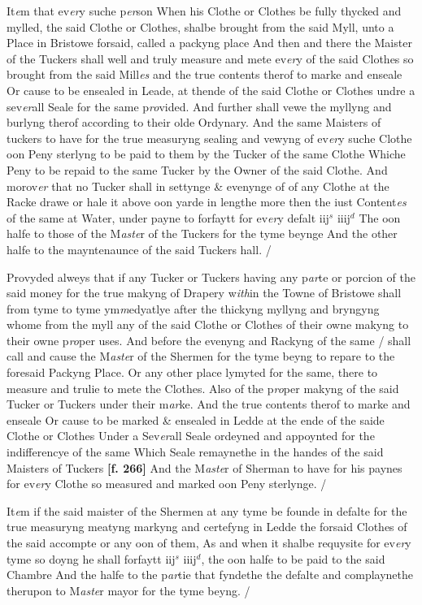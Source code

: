 \documentclass[a4paper,12pt]{article}
\begin{document}
It\textit{e}m that ev\textit{er}y suche p\textit{er}son When his Clothe or Clothes be fully thycked and mylled, the said Clothe or Clothes, shalbe brought from the said Myll, unto a Place in Bristowe forsaid, called a packyng place And then and there the Maister of the Tuckers shall well and truly measure and mete ev\textit{er}y of the said Clothes so brought from the said Mill\textit{es} and the true contents therof to marke and enseale Or cause to be ensealed in Leade, at thende of the said Clothe or Clothes undre a sev\textit{er}all Seale for the same p\textit{ro}vided. And further shall vewe the myllyng and burlyng therof according to their olde Ordynary. And the same Maisters of tuckers to have for the true measuryng sealing and vewyng of ev\textit{er}y suche Clothe oon Peny sterlyng to be paid to them by the Tucker of the same Clothe Whiche Peny to be repaid to the same Tucker by the Owner of the said Clothe. And morov\textit{er} that no Tucker shall in settynge \& evenynge of of any Clothe at the Racke drawe or hale it above oon yarde in lengthe more then the iust Content\textit{es} of the same at Water, under payne to forfaytt for ev\textit{er}y defalt iij$^{s}$ iiij$^{d}$  The oon halfe to those of the M\textit{aste}r of the Tuckers for the tyme beynge  And the other halfe to the mayntenaunce of the said Tuckers hall. /

Provyded alweys that if any Tucker or Tuckers having any p\textit{ar}te or porcion of the said money for the true makyng of Drapery w\textit{ith}in the Towne of Bristowe shall from tyme to tyme ym\textit{m}edyatlye after the thickyng myllyng and bryngyng whome from the myll any of the said Clothe or Clothes of their owne makyng to their owne p\textit{ro}per uses. And before the evenyng and Rackyng of the same / shall call and cause the M\textit{aste}r of the Shermen for the tyme beyng to repare to the foresaid Packyng Place. Or any other place lymyted for the same, there to measure and trulie to mete the Clothes. Also of the p\textit{ro}per makyng of the said Tucker or Tuckers under their m\textit{ar}ke. And the true contents therof to marke and enseale Or cause to be marked \& ensealed in Ledde at the ende of the saide Clothe or Clothes Under a Sev\textit{er}all Seale ordeyned and appoynted for the indifferencye of the same Which Seale remaynethe in the handes of the said Maisters of Tuckers \textbf{[f. 266]} And the M\textit{aste}r of Sherman to have for his paynes for ev\textit{er}y Clothe so measured and marked oon Peny sterlynge. /

It\textit{e}m if the said maister of the Shermen at any tyme be founde in defalte for the true measuryng meatyng markyng and certefyng in Ledde the forsaid Clothes of the said accompte or any oon of them, As and when it shalbe requysite for ev\textit{er}y tyme so doyng he shall forfaytt iij$^{s}$ iiij$^{d}$, the oon halfe to be paid to the said Chambre And the halfe to the p\textit{ar}tie that fyndethe the defalte and complaynethe therupon to M\textit{aste}r mayor for the tyme beyng. /
\end{document}
